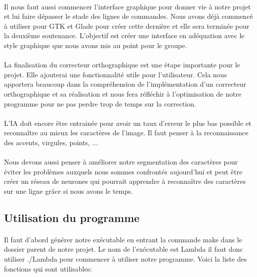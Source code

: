 \documentclass{article}
\begin{document}
\paragraph{}Il nous faut aussi commencer l'interface graphique pour donner vie à notre projet et lui faire dépasser le stade des lignes de commandes. Nous avons déjà commencé à utiliser pour GTK et Glade pour créer cette dernière et elle sera terminée pour la deuxième soutenance. L'objectif est créer une interface en adéquation avec le style graphique que nous avons mis au point pour le groupe.

\paragraph{}La finalisation du correcteur orthographique est une étape importante pour le projet. Elle ajouterai une fonctionnalité utile pour l'utilisateur. Cela nous apportera beaucoup dans la compréhension de l'implémentation d'un correcteur orthographique et sa réalisation et nous fera réfléchir à l'optimisation de notre programme pour ne pas perdre trop de temps sur la correction. 

\paragraph{}L'IA doit encore être entrainée pour avoir un taux d'erreur le plus bas possible et reconnaître au mieux les caractères de l'image. Il faut penser à la reconnaissance des accents, virgules, points, ...

\paragraph{}Nous devons aussi penser à améliorer notre segmentation des caractères pour éviter les problèmes auxquels nous sommes confrontés aujourd'hui et peut être créer un réseau de neurones qui pourrait apprendre à reconnaître des caractères sur une ligne grâce si nous avons le temps.

\newpage
\subsection{Utilisation du programme}

\paragraph{}Il faut d'abord générer notre exécutable en entrant la commande make dans le dossier parent de notre projet. Le nom de l'exécutable est Lambda il faut donc utiliser ./Lambda pour commencer à utiliser notre programme. Voici la liste des fonctions qui sont utilisables:
\end{document}
